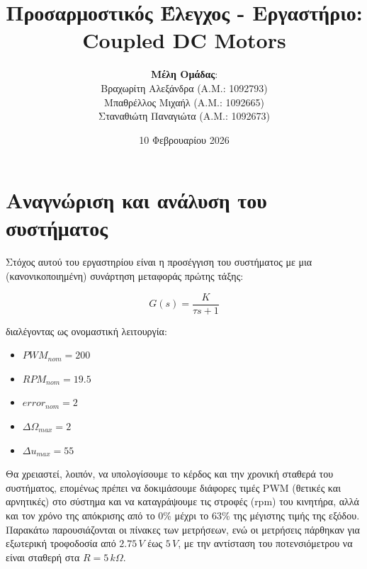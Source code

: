 \documentclass{article}
\title{\textbf{Προσαρμοστικός Έλεγχος - Εργαστήριο:\\Coupled DC Motors}}
\author{\small{\textbf{Μέλη Ομάδας}:} \\ \small{Βραχωρίτη Αλεξάνδρα (A.M.: 1092793)} \\ \small{Μπαθρέλλος Μιχαήλ (Α.Μ.: 1092665)} \\ \small{Σταναθιώτη Παναγιώτα (Α.Μ.: 1092673)}}
\date{\small{10 Φεβρουαρίου 2026}}
\begin{document}
\maketitle 
    \section{Αναγνώριση και ανάλυση του συστήματος}
    Στόχος αυτού του εργαστηρίου είναι η προσέγγιση του συστήματος με μια (κανονικοποιημένη) συνάρτηση μεταφοράς πρώτης τάξης:
    
    \begin{equation*}
        G(s) = \frac{K}{τs+1}
    \end{equation*}

    \hfill\break
    διαλέγοντας ως ονομαστική λειτουργία: 
    \begin{itemize}
        \item \(PWM_{nom} = 200\)
        \item \(RPM_{nom} = 19.5\)
        \item \(error_{nom} = 2\)
        \item \({\Delta\Omega}_{max} = 2\)
        \item \({\Delta u}_{max} = 55\)
    \end{itemize}
    
    \hfill\break
    Θα χρειαστεί, λοιπόν, να υπολογίσουμε το κέρδος και την χρονική σταθερά του συστήματος, επομένως πρέπει να δοκιμάσουμε διάφορες τιμές PWM (θετικές και αρνητικές) στο σύστημα και να καταγράψουμε τις στροφές (rpm) του κινητήρα, αλλά και τον χρόνο της απόκρισης από το 0\% μέχρι το 63\% της μέγιστης τιμής της εξόδου. Παρακάτω παρουσιάζονται οι πίνακες των μετρήσεων, ενώ οι μετρήσεις πάρθηκαν για εξωτερική τροφοδοσία από \(2.75\,V\) έως \(5\,V\), με την αντίσταση του ποτενσιόμετρου να είναι σταθερή στα \(R = 5\,k\Omega\).
\end{document}
